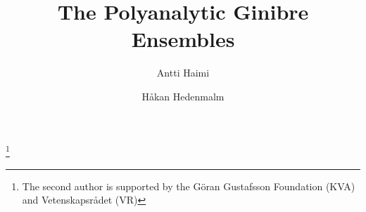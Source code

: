 \documentclass{birkart}
\theoremstyle{definition}
\theoremstyle{remark}
\numberwithin{equation}{section}
\numberwithin{figure}{section}
\newcommand{\1}{{\mathbf 1}}
\begin{document}
%
\title[The Polyanalytic Ginibre Ensembles]
{The Polyanalytic Ginibre Ensembles}

\author[Haimi]
{Antti Haimi}

\address{Haimi: Department of Mathematics\\
The Royal Institute of Technology\\
S -- 100 44 Stockholm\\
SWEDEN}




\author[Hedenmalm]
{Håkan Hedenmalm}

\address{Hedenmalm: Department of Mathematics\\
The Royal Institute of Technology\\
S -- 10044 Stockholm\\
SWEDEN}


\thanks{The second author is supported by the G\"oran Gustafsson Foundation 
(KVA) and Vetenskapsr\aa{}det (VR)}





\end{document}
